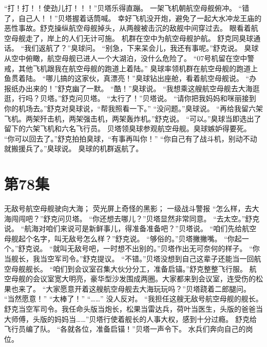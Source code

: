 \documentclass[a4paper,12pt,UTF8,twoside]{ctexbook}
\begin{document}
        “打！打！！使劲儿打！！！”贝塔乐得直蹦。 
        一架飞机朝航空母舰俯冲。 
        “错了，自己人！！”贝塔握着话筒喊。 
        幸好飞机没开炮，避免了一起大水冲龙王庙的恶性事故。舒克操纵航空母舰掉头，从两艘被击沉的敌舰中间穿过去。 
        眼看着航空母舰走了，岸上的人们无计可施。 
        机群在空中为航空母舰护航。 
        舒克同臭球通话。 
        “我们返航了？”臭球问。 
        “别急，下来呆会儿，我还有事呢。”舒克说。 
        臭球从空中俯瞰，航空母舰已进人一个大湖泊，没什么危险了。 
        “07号机留在空中警戒，其他飞机跟我在航空母舰的跑道上着陆。” 
        臭球率领机群在航空母舰的跑道上鱼贯着陆。 
        “哪儿搞的这家伙，真漂亮！”臭球钻出座舱，看着航空母舰说。 
        “办报纸办出来的！”舒克幽了一默。 
        “酷！”臭球说。 
        “我想乘这艘航空母舰去大海逛逛，行吗？贝塔。”舒克问贝塔。 
        “太行了！”贝塔说。 
        “请你把我妈妈和咪丽接到你的机场去。”舒克对臭球说，“帮我照看一下。” 
        “没问题。”臭球说。 
        “再给我留六架飞机。两架歼击机，两架强击机，两架轰炸机。”舒克说。 
        “可以。”臭球当即选出了留下的六架飞机和六名飞行员。 
        贝塔领臭球参观航空母舰。臭球嫉妒得要死。 
        “你可以回去了。”舒克拍拍臭球，“有事再叫你！” 
        “你自己有了战斗机，别动不动就搬援兵了。”臭球说。 
        臭球的机群返航了。   \chapter{第78集} 
        无敌号航空母舰驶向大海； 
        荧光屏上奇怪的黑影； 
        一级战斗警报   
        “怎么样，去大海闯闯吧？”舒克问贝塔。 
        “你还想去哪儿？”贝塔显然非常同意。 
        “去太空。”舒克说。 
        “航海对咱们来说可是新鲜事儿，得准备准备吧？”贝塔说。 
        “咱们先给航空母舰起个名字，叫无敌号怎么样？”舒克说。 
        “够俗的。”贝塔撇撇嘴。 
        “你起一个。”舒克说。 
        “就叫无敌号吧，一时想不出别的。”贝塔作出无可奈何的样子。 
        “你当舰长，我当空军司令。”舒克提议。 
        “不错。”贝塔没想到自己这辈子还能当一回航空母舰舰长。 
        “咱们到会议室召集大伙分分工，准备启锚。”舒克整整飞行服。 
        航空母舰的会议室宽大明亮，豪华型沙发围成两圈。大家都来到会议室，连受伤的松果也来了。 
        “大家愿意开着这艘航空母舰去大海玩玩吗？”贝塔跷着二郎腿问。 
        “当然愿意！” 
        “太棒了！” 
        “……” 
        没人反对。 
        “我担任这艘无敌号航空母舰的舰长。舒克当空军司令。我任命头版当炮长，松果当雷达兵，荷叶当医生，头版的爸爸当大师傅，头版的妈妈当……”贝塔行使着舰长的人事大权，感到十分过瘾。 
        舒克给飞行员编了队。 
        “各就各位，准备启锚！”贝塔一声令下。 
        水兵们奔向自己的岗位。 
\end{document}
